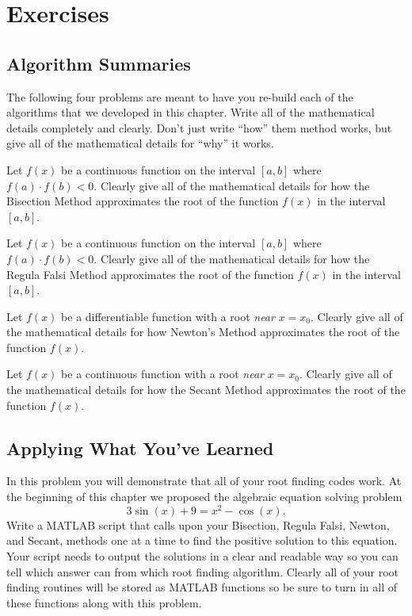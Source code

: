 \newpage\section{Exercises}

\subsection{Algorithm Summaries}
The following four problems are meant to have you re-build each of the algorithms that
we developed in this chapter.  Write all of the mathematical details completely and
clearly.  Don't just write ``how'' them method works, but give all of the mathematical
details for ``why'' it works.
\begin{problem}
    Let $f(x)$ be a continuous function on the interval $[a,b]$ where $f(a) \cdot f(b) <
    0$.  Clearly give all of the mathematical details for how the Bisection Method
    approximates the root of the function $f(x)$ in the interval $[a,b]$.  
\end{problem}

\begin{problem}
    Let $f(x)$ be a continuous function on the interval $[a,b]$ where $f(a) \cdot f(b) <
    0$.  Clearly give all of the mathematical details for how the Regula Falsi Method
    approximates the root of the function $f(x)$ in the interval $[a,b]$. 
\end{problem}

\begin{problem}
    Let $f(x)$ be a differentiable function with a root {\it near} $x=x_0$.  Clearly give
    all of the mathematical details for how Newton's Method approximates the root of the
    function $f(x)$.
\end{problem}

\begin{problem}
    Let $f(x)$ be a continuous function with a root {\it near} $x=x_0$.  Clearly give
    all of the mathematical details for how the Secant Method approximates the root of the
    function $f(x)$.
\end{problem}

\subsection{Applying What You've Learned}

\begin{problem}
    In this problem you will demonstrate that all of your root finding codes work.
    At the beginning of this chapter we proposed the algebraic equation solving problem
    \[ 3\sin(x) + 9 = x^2 - \cos(x). \]
    Write a MATLAB script that calls upon your Bisection, Regula Falsi, Newton, and
    Secant, methods one at a time to find the positive solution to this equation.  Your
    script needs to output the solutions in a clear and readable way so you can tell which
    answer can from which root finding algorithm. Clearly all of your root finding
    routines will be stored as MATLAB functions so be sure to turn in all of these
    functions along with this problem.
\end{problem}




